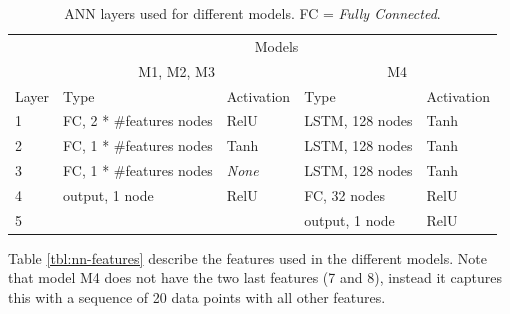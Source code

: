\begin{table}[h]
	\centering
	\caption{ANN layers used for different models. FC = \textit{Fully Connected}.}
	\label{tbl:nn-layers}
	\begin{tabular}{l|l|l|l|l}
		& \multicolumn{4}{c}{Models}                                                                                           \\ \cline{2-5} 
		& \multicolumn{2}{c|}{M1, M2, M3}                           & \multicolumn{2}{c}{M4}                                   \\ \hline
		Layer & Type                     & Activation                     & Type                     & Activation                     \\ \hline
		1     & FC, 2 * \#features nodes & RelU                           & LSTM, 128 nodes          & Tanh                        \\
		2     & FC, 1 * \#features nodes & Tanh                           & LSTM, 128 nodes          & Tanh                        \\
		3     & FC, 1 * \#features nodes & \textit{None} & LSTM, 128 nodes          & Tanh                        \\
		4     & output, 1 node           & RelU                           & FC, 32 nodes & RelU                           \\
		5     &                          &                                & output, 1 node           & RelU
	\end{tabular}
\end{table}

Table \ref{tbl:nn-features} describe the features used in the different models. Note that model M4 does not have the two last features (7 and 8), instead it captures this with a sequence of 20 data points with all other features.

